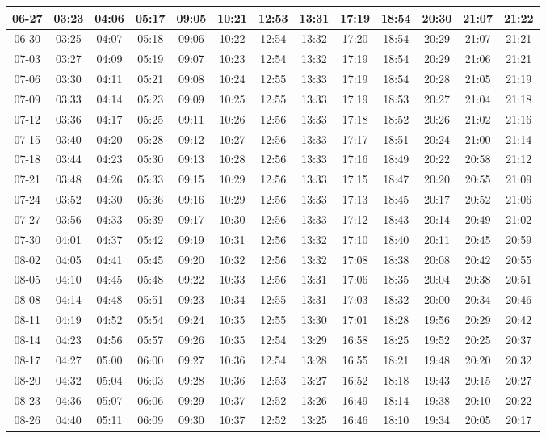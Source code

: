 \begin{footnotesize}
\begin{longtable}{c | c | c | c | c | c | c | c | c | c | c | c | c}
		06-27&03:23&04:06&05:17&09:05&10:21&12:53&13:31&17:19&18:54&20:30&21:07&21:22\\\hline
		06-30&03:25&04:07&05:18&09:06&10:22&12:54&13:32&17:20&18:54&20:29&21:07&21:21\\\hline
		07-03&03:27&04:09&05:19&09:07&10:23&12:54&13:32&17:19&18:54&20:29&21:06&21:21\\\hline
		07-06&03:30&04:11&05:21&09:08&10:24&12:55&13:33&17:19&18:54&20:28&21:05&21:19\\\hline
		07-09&03:33&04:14&05:23&09:09&10:25&12:55&13:33&17:19&18:53&20:27&21:04&21:18\\\hline
		07-12&03:36&04:17&05:25&09:11&10:26&12:56&13:33&17:18&18:52&20:26&21:02&21:16\\\hline
		07-15&03:40&04:20&05:28&09:12&10:27&12:56&13:33&17:17&18:51&20:24&21:00&21:14\\\hline
		07-18&03:44&04:23&05:30&09:13&10:28&12:56&13:33&17:16&18:49&20:22&20:58&21:12\\\hline
		07-21&03:48&04:26&05:33&09:15&10:29&12:56&13:33&17:15&18:47&20:20&20:55&21:09\\\hline
		07-24&03:52&04:30&05:36&09:16&10:29&12:56&13:33&17:13&18:45&20:17&20:52&21:06\\\hline
		07-27&03:56&04:33&05:39&09:17&10:30&12:56&13:33&17:12&18:43&20:14&20:49&21:02\\\hline
		07-30&04:01&04:37&05:42&09:19&10:31&12:56&13:32&17:10&18:40&20:11&20:45&20:59\\\hline
		08-02&04:05&04:41&05:45&09:20&10:32&12:56&13:32&17:08&18:38&20:08&20:42&20:55\\\hline
		08-05&04:10&04:45&05:48&09:22&10:33&12:56&13:31&17:06&18:35&20:04&20:38&20:51\\\hline
		08-08&04:14&04:48&05:51&09:23&10:34&12:55&13:31&17:03&18:32&20:00&20:34&20:46\\\hline
		08-11&04:19&04:52&05:54&09:24&10:35&12:55&13:30&17:01&18:28&19:56&20:29&20:42\\\hline
		08-14&04:23&04:56&05:57&09:26&10:35&12:54&13:29&16:58&18:25&19:52&20:25&20:37\\\hline
		08-17&04:27&05:00&06:00&09:27&10:36&12:54&13:28&16:55&18:21&19:48&20:20&20:32\\\hline
		08-20&04:32&05:04&06:03&09:28&10:36&12:53&13:27&16:52&18:18&19:43&20:15&20:27\\\hline
		08-23&04:36&05:07&06:06&09:29&10:37&12:52&13:26&16:49&18:14&19:38&20:10&20:22\\\hline
		08-26&04:40&05:11&06:09&09:30&10:37&12:52&13:25&16:46&18:10&19:34&20:05&20:17\\\hline

\end{longtable}
\end{footnotesize}
